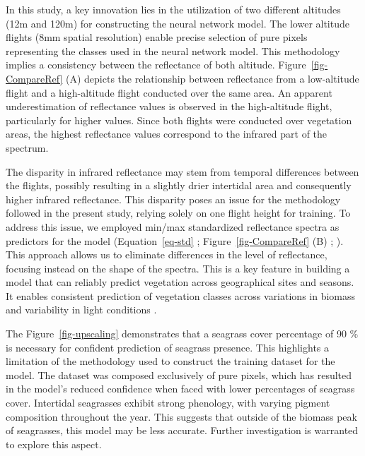 \documentclass[
  number]{elsarticle}
\begin{document}
In this study, a key innovation lies in the utilization of two different
altitudes (12m and 120m) for constructing the neural network model. The
lower altitude flights (8mm spatial resolution) enable precise selection
of pure pixels representing the classes used in the neural network
model. This methodology implies a consistency between the reflectance of
both altitude. Figure~\ref{fig-CompareRef} (A) depicts the relationship
between reflectance from a low-altitude flight and a high-altitude
flight conducted over the same area. An apparent underestimation of
reflectance values is observed in the high-altitude flight, particularly
for higher values. Since both flights were conducted over vegetation
areas, the highest reflectance values correspond to the infrared part of
the spectrum.

The disparity in infrared reflectance may stem from temporal differences
between the flights, possibly resulting in a slightly drier intertidal
area and consequently higher infrared reflectance. This disparity poses
an issue for the methodology followed in the present study, relying
solely on one flight height for training. To address this issue, we
employed min/max standardized reflectance spectra as predictors for the
model (Equation~\ref{eq-std} ; Figure~\ref{fig-CompareRef} (B) ;
\citep{Cao2017}). This approach allows us to eliminate differences in
the level of reflectance, focusing instead on the shape of the spectra.
This is a key feature in building a model that can reliably predict
vegetation across geographical sites and seasons. It enables consistent
prediction of vegetation classes across variations in biomass and
variability in light conditions \citetext{\citealp[
]{fyfe2003spatial}; \citealp[
]{COSTA2021107018}; \citealp{piaser2023impact}}.

The Figure~\ref{fig-upscaling} demonstrates that a seagrass cover
percentage of 90 \% is necessary for confident prediction of seagrass
presence. This highlights a limitation of the methodology used to
construct the training dataset for the model. The dataset was composed
exclusively of pure pixels, which has resulted in the model's reduced
confidence when faced with lower percentages of seagrass cover.
Intertidal seagrasses exhibit strong phenology, with varying pigment
composition throughout the year\citetext{\citealp[
]{bargain2013seasonal}; \citealp{legare2022remote}}. This suggests that
outside of the biomass peak of seagrasses, this model may be less
accurate. Further investigation is warranted to explore this aspect.
\end{document}
